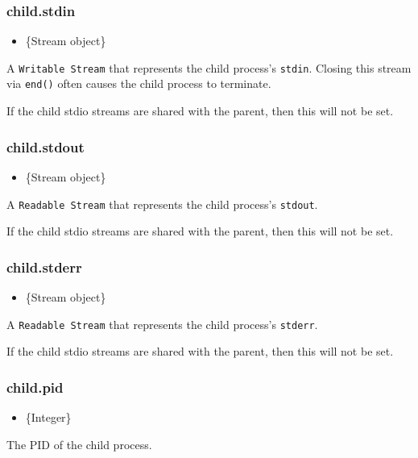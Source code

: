 \subsubsection{child.stdin}

\begin{itemize}
\item
  \{Stream object\}
\end{itemize}

A \texttt{Writable Stream} that represents the child process's
\texttt{stdin}. Closing this stream via \texttt{end()} often causes the
child process to terminate.

If the child stdio streams are shared with the parent, then this will
not be set.

\subsubsection{child.stdout}

\begin{itemize}
\item
  \{Stream object\}
\end{itemize}

A \texttt{Readable Stream} that represents the child process's
\texttt{stdout}.

If the child stdio streams are shared with the parent, then this will
not be set.

\subsubsection{child.stderr}

\begin{itemize}
\item
  \{Stream object\}
\end{itemize}

A \texttt{Readable Stream} that represents the child process's
\texttt{stderr}.

If the child stdio streams are shared with the parent, then this will
not be set.

\subsubsection{child.pid}

\begin{itemize}
\item
  \{Integer\}
\end{itemize}

The PID of the child process.

